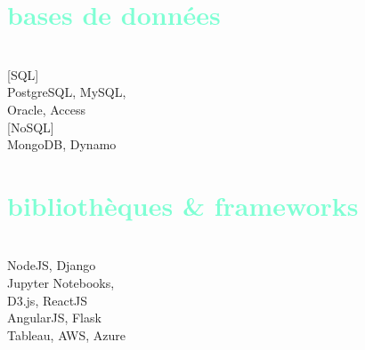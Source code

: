 \documentclass[francais]{cv-style}          %
\begin{document}
\lastupdated



\begin{aside}
%
\vspace{5cm}
\section{\textcolor{aquamarine}{bases de données}}\\
\vspace{0.2cm}
{[SQL]}\\
{PostgreSQL, MySQL,\\
\vspace{0.1cm}
Oracle, Access}\\
\vspace{0.5cm}
{[NoSQL]}\\
{MongoDB, Dynamo}\\
%
\vspace{5cm}
\section{\textcolor{aquamarine}{bibliothèques \& frameworks}}\\
\vspace{0.2cm}
{NodeJS, Django\\
\vspace{0.1cm}
Jupyter Notebooks,\\
\vspace{0.1cm}
D3.js, ReactJS\\
\vspace{0.1cm}
AngularJS, Flask\\
\vspace{0.1cm}
Tableau, AWS, Azure}\\
%
\end{aside}
\end{document}
